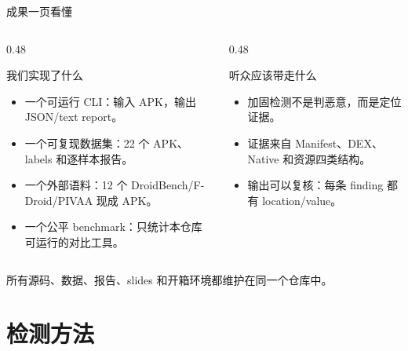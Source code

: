 \documentclass[10pt,aspectratio=169]{beamer}
\begin{document}
\begin{frame}{成果一页看懂}
  \begin{columns}[T,totalwidth=\textwidth]
    \begin{column}{0.48\textwidth}
      \begin{block}{我们实现了什么}
        \begin{itemize}
          \item 一个可运行 CLI：输入 APK，输出 JSON/text report。
          \item 一个可复现数据集：22 个 APK、labels 和逐样本报告。
          \item 一个外部语料：12 个 DroidBench/F-Droid/PIVAA 现成 APK。
          \item 一个公平 benchmark：只统计本仓库可运行的对比工具。
        \end{itemize}
      \end{block}
    \end{column}
    \begin{column}{0.48\textwidth}
      \begin{block}{听众应该带走什么}
        \begin{itemize}
          \item 加固检测不是判恶意，而是定位证据。
          \item 证据来自 Manifest、DEX、Native 和资源四类结构。
          \item 输出可以复核：每条 finding 都有 location/value。
        \end{itemize}
      \end{block}
    \end{column}
  \end{columns}
  \vspace{0.45em}
  所有源码、数据、报告、slides 和开箱环境都维护在同一个仓库中。
\end{frame}

\section{检测方法}
\end{document}
